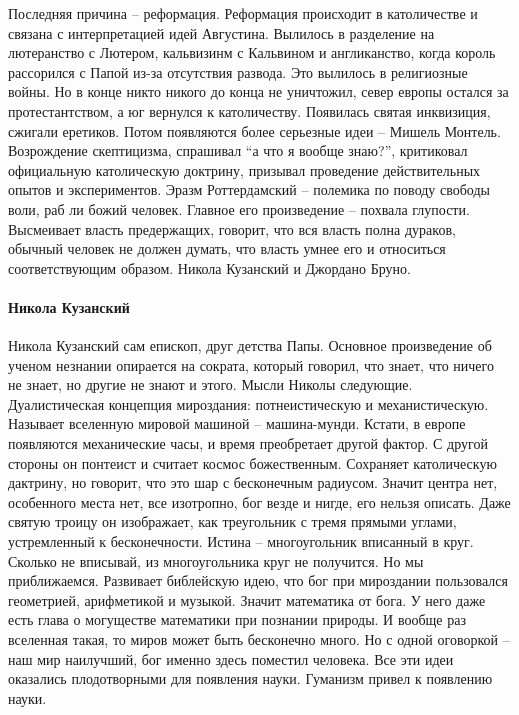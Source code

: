 \documentclass[a4paper, 12pt]{article}
\begin{document}
Последняя причина -- реформация. Реформация происходит в католичестве и связана с интерпретацией идей Августина. Вылилось в разделение на лютеранство с Лютером, кальвизинм с Кальвином и англиканство, когда король рассорился с Папой из-за отсутствия развода. Это вылилось в религиозные войны. Но в конце никто никого до конца не уничтожил, север европы  остался за протестантством, а юг вернулся к католичеству. Появилась святая инквизиция, сжигали еретиков. Потом появляются более серьезные идеи -- Мишель Монтель. Возрождение скептицизма, спрашивал ``а что я вообще знаю?'', критиковал официальную католическую доктрину, призывал проведение действительных опытов и экспериментов. Эразм Роттердамский -- полемика по поводу свободы воли, раб ли божий человек. Главное его произведение -- похвала глупости. Высмеивает власть предержащих, говорит, что вся власть полна дураков, обычный человек не должен думать, что власть умнее его и относиться соответствующим образом. Никола Кузанский и Джордано Бруно. 

\paragraph{Никола Кузанский}Никола Кузанский сам епископ, друг детства Папы. Основное произведение об ученом незнании опирается на сократа, который говорил, что знает, что ничего не знает, но другие не знают и этого. Мысли Николы следующие. Дуалистическая концепция мироздания: потнеистическую и механистическую. Называет вселенную мировой машиной -- машина-мунди. Кстати, в европе появляются механические часы, и время преобретает другой фактор. С другой стороны он понтеист и считает космос божественным. Сохраняет католическую дактрину, но говорит, что это шар с бесконечным радиусом. Значит центра нет, особенного места нет, все изотропно, бог везде и нигде, его нельзя описать. Даже святую троицу он изображает, как треугольник с тремя прямыми углами, устремленный к бесконечности. Истина -- многоугольник вписанный в круг. Сколько не вписывай, из многоугольника круг не получится. Но мы приближаемся. Развивает библейскую идею, что бог при мироздании пользовался геометрией, арифметикой и музыкой. Значит математика от бога. У него даже есть глава о могуществе математики при познании природы. И вообще раз вселенная такая, то миров может быть бесконечно много. Но с одной оговоркой -- наш мир наилучший, бог именно здесь поместил человека. Все эти идеи оказались плодотворными для появления науки. Гуманизм привел к появлению науки. 
\end{document}
